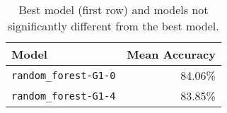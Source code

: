 \begin{table}[H]
\centering
\begin{tabularx}{0.48\textwidth}{|X|r|}
\hline
Model & Mean Accuracy \\
\hline
\texttt{random\_forest-G1-0} & 84.06\% \\
\texttt{random\_forest-G1-4} & 83.85\% \\
\hline
\end{tabularx}
\caption{Best model (first row) and models not significantly different from the best model.}
\label{tab:best_models}

\end{table}
